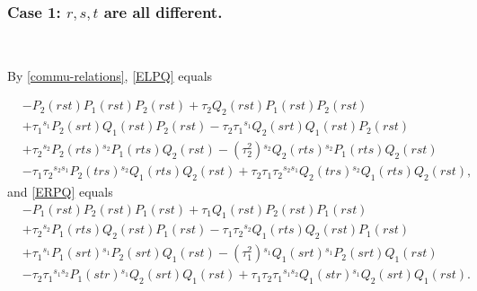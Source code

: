 \documentclass[11pt, reqno]{amsart} \textwidth=14.9cm \oddsidemargin=1cm \evensidemargin=1cm
\theoremstyle{definition}
\numberwithin{equation}{section}
\begin{document}
\subsubsection*{Case 1: $r, s, t$ are all different.}

\

\vspace{0.35cm}\noindent By \eqref{commu-relations}, \eqref{ELPQ} equals

\begin{equation*}
\begin{split}
&-P_2(rst)P_1(rst)P_2(rst)+ \tau_2Q_2(rst)P_1(rst)P_2(rst)
\\
&+ \tau_1{}^{s_{1}}P_2(srt)Q_1(rst)P_2(rst)
-\tau_2\tau_1{}^{s_{1}}Q_2(srt)Q_1(rst)P_2(rst)
\\
&+ \tau_2{}^{s_{2}}P_2(rts){}^{s_{2}}P_1(rts)Q_2(rst)
- (\tau_2^{2}){}^{s_{2}}Q_2(rts){}^{s_{2}}P_1(rts)Q_2(rst)
\\
&- \tau_1\tau_2{}^{s_{2}s_{1}}P_2(trs){}^{s_{2}}Q_1(rts)Q_2(rst)
+ \tau_2\tau_1\tau_2{}^{s_{2}s_{1}}Q_2(trs){}^{s_{2}}Q_1(rts)Q_2(rst),
\end{split}
\end{equation*}
and \eqref{ERPQ} equals
\begin{equation*}
\begin{split}
&-P_1(rst)P_2(rst)P_1(rst)+ \tau_1Q_1(rst)P_2(rst)P_1(rst)
\\&+ \tau_2{}^{s_{2}}P_1(rts)Q_2(rst)P_1(rst)
-\tau_1\tau_2{}^{s_{2}}Q_1(rts)Q_2(rst)P_1(rst)
\\&+ \tau_1{}^{s_{1}}P_1(srt){}^{s_{1}}P_2(srt)Q_1(rst)
- (\tau_1^{2}){}^{s_{1}}Q_1(srt){}^{s_{1}}P_2(srt)Q_1(rst)
\\& - \tau_2\tau_1{}^{s_{1}s_{2}}P_1(str){}^{s_{1}}Q_2(srt)Q_1(rst)
+ \tau_1\tau_2\tau_1{}^{s_{1}s_{2}}Q_1(str){}^{s_{1}}Q_2(srt)Q_1(rst).
\end{split}
\end{equation*}
\end{document}

